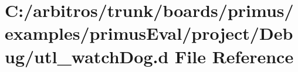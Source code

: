 \hypertarget{boards_2primus_2examples_2primus_eval_2project_2_debug_2utl__watch_dog_8d}{\section{C\-:/arbitros/trunk/boards/primus/examples/primus\-Eval/project/\-Debug/utl\-\_\-watch\-Dog.d File Reference}
\label{boards_2primus_2examples_2primus_eval_2project_2_debug_2utl__watch_dog_8d}
}
